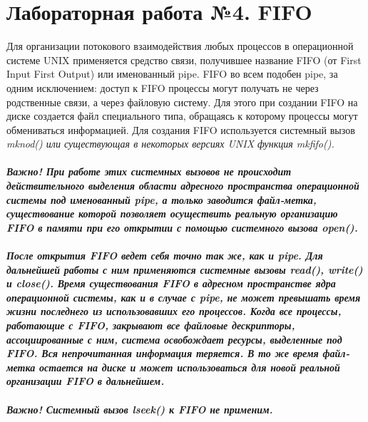\documentclass[a4paper]{article}
\begin{document}
\section{\bf Лабораторная работа №4. FIFO}
Для организации потокового взаимодействия любых процессов в операционной системе UNIX применяется средство связи, получившее название FIFO (от First Input First Output) или именованный pipe. FIFO во всем подобен pipe, за одним исключением: доступ к FIFO процессы могут получать не через родственные связи, а через файловую систему. Для этого при создании FIFO на диске создается файл специального типа, обращаясь к которому процессы могут обмениваться информацией. Для создания FIFO используется системный вызов \sl mknod() \rm или существующая в некоторых версиях UNIX функция \sl mkfifo().\\\\
\rm \bf Важно! \rm При работе этих системных вызовов не происходит действительного выделения области адресного пространства операционной системы под именованный pipe, а только заводится файл-метка, существование которой позволяет осуществить реальную организацию FIFO в памяти при его открытии с помощью системного вызова \sl open().\\\\
После открытия FIFO ведет себя точно так же, как и pipe. Для дальнейшей работы с ним применяются системные вызовы \sl read(), write() и close(). \rm Время существования FIFO в адресном пространстве ядра операционной системы, как и в случае с pipe, не может превышать время жизни последнего из использовавших его процессов. Когда все процессы, работающие с FIFO, закрывают все файловые дескрипторы, ассоциированные с ним, система освобождает ресурсы, выделенные под FIFO. Вся непрочитанная информация теряется. В то же время файл-метка остается на диске и может использоваться для новой реальной организации FIFO в дальнейшем.\\\\
\bf Важно! \rm Системный вызов lseek() к FIFO не применим.
\end{document}
